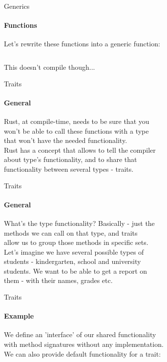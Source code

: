 \documentclass[usenames,dvipsnames,10pt,aspectratio=169]{beamer}
\begin{document}
\begin{frame}{Generics}
	\framesubtitle{Functions}
	\large
	Let's rewrite these functions into a generic function:\\
	\vspace{0.2cm}
	\inputminted[fontsize=\Large]{rust}{code/generics5.rs}
	\vspace{0.2cm}
	This doesn't compile though...\\
\end{frame}

\begin{frame}{Traits}
	\framesubtitle{General}
	\large
	Rust, at compile-time, needs to be sure that you\\
	won't be able to call these functions with a type\\
	that won't have the needed functionality.\\
	\vspace{0.3cm}
	Rust has a concept that allows to tell the compiler\\
	about type's functionality, and to share that\\
	functionality between several types - \textcolor{ucuyellow}{traits}.\\
\end{frame}	

\begin{frame}{Traits}
	\framesubtitle{General}
	\large
	What's the type functionality? Basically - just the\\
	methods we can call on that type, and traits\\
	allow us to group those methods in specific sets.\\
	\vspace{0.4cm}
	Let's imagine we have several possible types of\\
	students - kindergarten, school and university\\
	students. We want to be able to get a report on\\
	them - with their names, grades etc.\\
\end{frame}

\begin{frame}{Traits}
	\framesubtitle{Example}
	\large
	We define an 'interface' of our shared functionality\\
	with method signatures without any implementation.\\
	We can also provide default functionality for a trait:\\
	\vspace{0.2cm}
	\inputminted[fontsize=\normalsize]{rust}{code/traits1.rs}
	\vspace{0.2cm}
\end{frame}
\end{document}
